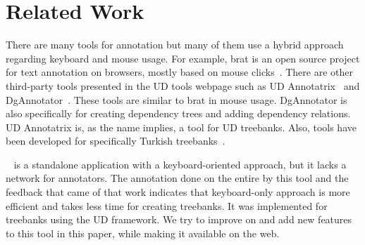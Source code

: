 \section{Related Work}
\label{sec:related}

There are many tools for annotation but many of them use a hybrid approach regarding keyboard and mouse usage.
For example, brat is an open source project for text annotation on browsers, mostly based on mouse clicks~\cite{brat}\cite{UD}.
There are other third-party tools presented in the UD tools webpage such as UD Annotatrix~\cite{tyers-etal:2018} and DgAnnotator~\cite{dgannotator}.
These tools are similar to brat in mouse usage.
DgAnnotator is also specifically for creating dependency trees and adding dependency relations.
UD Annotatrix is, as the name implies, a tool for UD treebanks.
Also, tools have been developed for specifically Turkish treebanks~\cite{turk-etal-2019-turkish}.

\boatvone~\cite{turk-etal-2019-turkish} is a standalone application with a keyboard-oriented approach, but it lacks a network for annotators.
The annotation done on the entire \bountreebank{} by this tool and the feedback that came of that work indicates that keyboard-only approach is more efficient and takes less time for creating treebanks.
It was implemented for treebanks using the UD framework.
We try to improve on and add new features to this tool in this paper, while making it available on the web.
